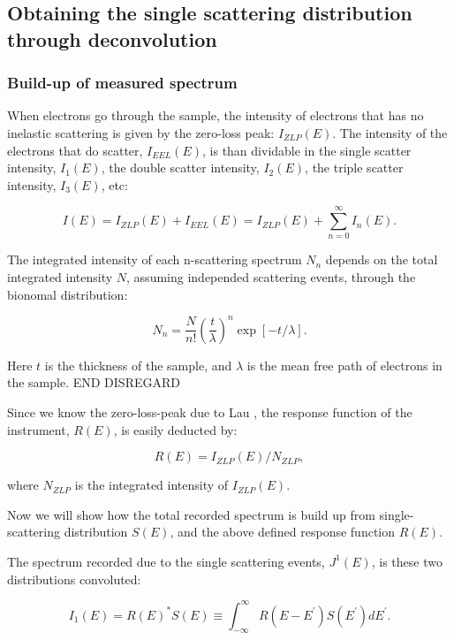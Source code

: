 \subsection{Obtaining the single scattering distribution through deconvolution} \label{sect_deconv}

\subsubsection{Build-up of measured spectrum}
When electrons go through the sample, the intensity of electrons that has no inelastic scattering is given by the zero-loss peak: $I_{ZLP}(E)$. The intensity of the electrons that do scatter, $I_{EEL}(E)$, is than dividable in the single scatter intensity, $I_1(E)$, the double scatter intensity, $I_2(E)$, the triple scatter intensity, $I_3(E)$, etc:

\begin{equation}\label{eq_I}
    I(E) = I_{ZLP}(E) + I_{EEL}(E) = I_{ZLP}(E) + \sum_{n=0}^\infty I_n(E).
\end{equation}


The integrated intensity of each n-scattering spectrum $N_n$  depends on the total integrated intensity $N$, assuming independed scattering events, through the bionomal distribution:

\begin{equation}\label{eq_N_n}
    N_n =  \frac{N}{n!} \left(\frac{t}{\lambda}\right)^n \exp{[-t/\lambda]} .
\end{equation}

Here $t$ is the thickness of the sample, and $\lambda$ is the mean free path of electrons in the sample. 
END DISREGARD

Since we know the zero-loss-peak due to Lau \cite{lau}, the response function of the instrument, $R(E)$, is easily deducted by:

\begin{equation}
    R(E) = I_{ZLP}(E)/N_{ZLP},
\end{equation}

where $N_{ZLP}$ is the integrated intensity of $I_{ZLP}(E)$. 


Now we will show how the total recorded spectrum is build up from single-scattering distribution $S(E)$, and the above defined response function $R(E)$. 


The spectrum recorded due to the single scattering events, $J^1(E)$, is these two distributions convoluted:

\begin{equation} \label{eq_I_1}
    I_{1}(E)=R(E)^{*} S(E) \equiv \int_{-\infty}^{\infty} R\left(E-E^{\prime}\right) S\left(E^{\prime}\right) d E^{\prime}.
\end{equation}


